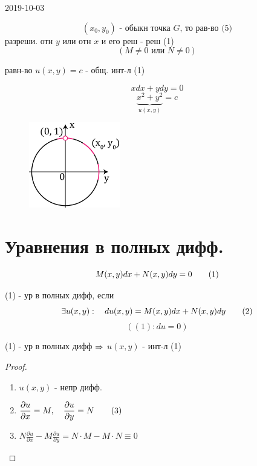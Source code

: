 \documentclass[main]{subfiles}
\begin{document}
\begin{lect}{2019-10-03}
		\begin{Theorem} [2]

		\end{Theorem}

		\begin{Consequence}
				\[(x_0, y_0) \text{ - обыкн точка } G \text{, то рав-во (5)} \]
				разреши. отн $y$ или отн $x$ и его реш - реш (1)
				\[(M \neq 0 \text{ или } N \neq 0)\]
		\end{Consequence}

		\begin{definition}
				равн-во $u(x, y) = c$ - общ. инт-л (1)
		\end{definition}

		\begin{Example}
				\[xdx + ydy = 0\]
				\[\underbrace{x^2 + y^2}_{u(x, y)}  = c\]
				\begin{figure}[H]
						\includegraphics[width=4cm]{pics/5_1.png}
						\centering
				\end{figure}
		\end{Example}

		\section{Уравнения в полных дифф.}

		\[M(x, y)dx + N(x, y)dy = 0 \qquad (1)\]

		\begin{definition}
				(1) - ур в полных дифф, если
				\[\exists u(x, y) : \quad du(x, y) = M(x, y)dx + N(x, y)dy \qquad (2)\]
				\[( (1) : du = 0) \]
		\end{definition}

		\begin{theorem}[1]
				(1) - ур в полных дифф $\Rightarrow$ $u(x, y)$ - инт-л (1)
		\end{theorem}

		\begin{proof}
		    \begin{enumerate}
						\item $u(x, y)$ - непр дифф.
						\item $\displaystyle  \frac{\partial u}{\partial x} = M, \quad \frac{\partial u}{\partial y} = N \qquad (3)$
						\item $N \frac{\partial u}{\partial x} - M \frac{\partial u}{\partial y} = N \cdot M - M \cdot N \equiv 0$
		    \end{enumerate}
		\end{proof}


\end{lect}
\end{document}
